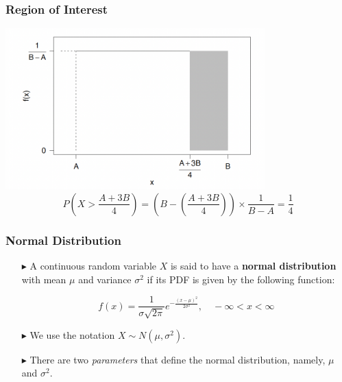 \documentclass[12pt]{beamer}
\begin{document}
\begin{frame}
	\frametitle{Region of Interest}
	
\centering
\includegraphics[width=10cm]{uniform4.png}
		$$P\left(X > \frac{A + 3B}{4}\right)=(B-(\frac{A+3B}{4}))\times\frac{1}{B-A}=\frac{1}{4}$$
	
	
\end{frame}

\begin{frame}
	\frametitle{Normal Distribution}
	
	\begin{itemize}
		\item[\color{blue}$\blacktriangleright$] A continuous random variable $X$ is said to have a 
		\textbf{normal distribution} with mean $\mu$ and variance $\sigma^2$ 
		if its PDF is given by the following function:
		
		\vspace{0.5em}
		\[
		f(x) = \frac{1}{\sigma\sqrt{2\pi}} e^{-\frac{(x-\mu)^2}{2\sigma^2}}, \quad -\infty < x < \infty
		\]
		\vspace{0.5em}
		
		\item[\color{blue}$\blacktriangleright$] We use the notation $X \sim N(\mu, \sigma^2)$.
		
		\item[\color{blue}$\blacktriangleright$] There are two {\sl parameters} that define the normal distribution, namely, $\mu$ and $\sigma^2$.
	\end{itemize}
	
\end{frame}
\end{document}
